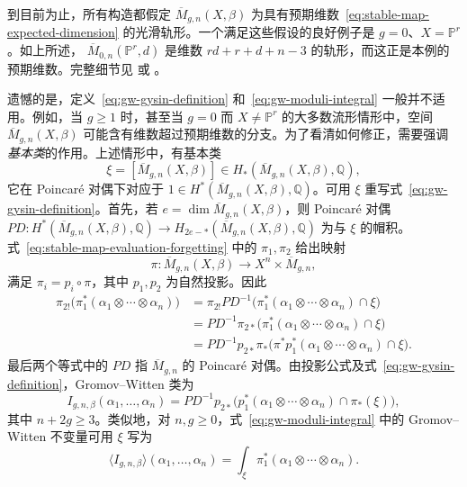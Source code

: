 到目前为止，所有构造都假定 $\overline M_{g,n}(X,\beta)$ 为具有预期维数~\eqref{eq:stable-map-expected-dimension} 的光滑轨形。一个满足这些假设的良好例子是 $g=0$、$X=\mathbb P^r$。如上所述，
$\overline M_{0,n}(\mathbb P^r,d)$ 是维数 $rd+r+d+n-3$ 的轨形，而这正是本例的预期维数。完整细节见  或 。

遗憾的是，定义~\eqref{eq:gw-gysin-definition} 和~\eqref{eq:gw-moduli-integral} 一般并不适用。例如，当 $g\geq1$ 时，甚至当 $g=0$ 而 $X\ne\mathbb P^r$ 的大多数流形情形中，空间 $\overline M_{g,n}(X,\beta)$
可能含有维数超过预期维数的分支。为了看清如何修正，需要强调\emph{基本类}的作用。上述情形中，有基本类
\[
\xi=[\overline M_{g,n}(X,\beta)]
\in H_*(\overline M_{g,n}(X,\beta),\mathbb Q),
\]
它在 Poincaré 对偶下对应于 $1\in H^*(\overline M_{g,n}(X,\beta),\mathbb Q)$。可用 $\xi$ 重写式~\eqref{eq:gw-gysin-definition}。首先，若
$e=\dim\overline M_{g,n}(X,\beta)$，则 Poincaré 对偶
$PD:H^*(\overline M_{g,n}(X,\beta),\mathbb Q)\to H_{2e-*}(\overline M_{g,n}(X,\beta),\mathbb Q)$ 为与 $\xi$ 的帽积。式~\eqref{eq:stable-map-evaluation-forgetting} 中的 $\pi_1,\pi_2$ 给出映射
\[
\pi:\overline M_{g,n}(X,\beta)\longrightarrow X^n\times\overline M_{g,n},
\]
满足 $\pi_i=p_i\circ\pi$，其中 $p_1,p_2$ 为自然投影。因此
\[
\begin{aligned}
\pi_{2!}\bigl(\pi_1^*(\alpha_1\otimes\cdots\otimes\alpha_n)\bigr)
&=\pi_{2!}PD^{-1}\bigl(\pi_1^*(\alpha_1\otimes\cdots\otimes\alpha_n)\cap\xi\bigr)\\
&=PD^{-1}\pi_{2*}\bigl(\pi_1^*(\alpha_1\otimes\cdots\otimes\alpha_n)\cap\xi\bigr)\\
&=PD^{-1}p_{2*}\pi_*\bigl(\pi^*p_1^*(\alpha_1\otimes\cdots\otimes\alpha_n)\cap\xi\bigr).
\end{aligned}
\]
最后两个等式中的 $PD$ 指 $\overline M_{g,n}$ 的 Poincaré 对偶。由投影公式及式~\eqref{eq:gw-gysin-definition}，Gromov--Witten 类为
\begin{equation}\label{eq:gw-fundamental-class-definition}
I_{g,n,\beta}(\alpha_1,\ldots,\alpha_n)
=PD^{-1}p_{2*}\bigl(p_1^*(\alpha_1\otimes\cdots\otimes\alpha_n)\cap\pi_*(\xi)\bigr),
\end{equation}
其中 $n+2g\geq3$。类似地，对 $n,g\geq0$，式~\eqref{eq:gw-moduli-integral} 中的 Gromov--Witten 不变量可用 $\xi$ 写为
\[
\langle I_{g,n,\beta}\rangle(\alpha_1,\ldots,\alpha_n)
=\int_\xi\pi_1^*(\alpha_1\otimes\cdots\otimes\alpha_n).
\]

